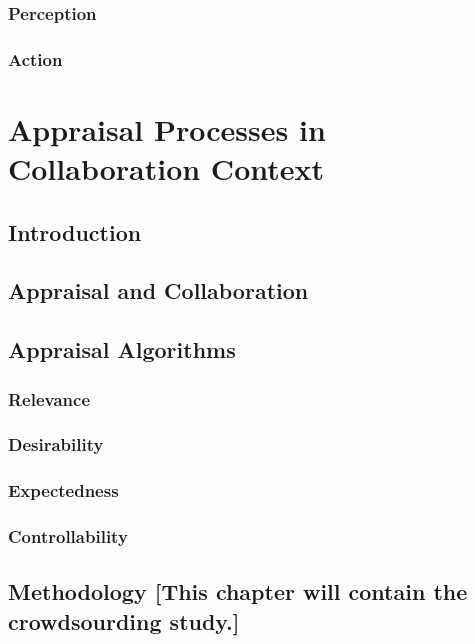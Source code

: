 \documentclass[12pt]{report}
\begin{document}
\subsection{Perception}

\subsection{Action}

\chapter{Appraisal Processes in Collaboration Context}
\label{ch:appraisals}

\section{Introduction}

\section{Appraisal and Collaboration}

\section{Appraisal Algorithms}

\subsection{Relevance}

\subsection{Desirability}

\subsection{Expectedness}

\subsection{Controllability}

\section{Methodology [This chapter will contain the crowdsourding study.]}
\end{document}
